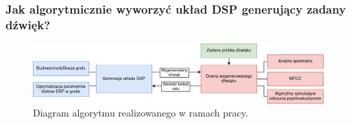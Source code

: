\documentclass[]{beamer}
\begin{document}




\begin{frame}
  \frametitle{Jak algorytmicznie wyworzyć układ DSP generujący zadany dźwięk?}

  \begin{figure}
    \centering
    \includegraphics[width=1.0\linewidth]{algorithm-diagram.png}
    \caption{Diagram algorytmu realizowanego w ramach pracy.}
  \end{figure}
\end{frame}
\end{document}
